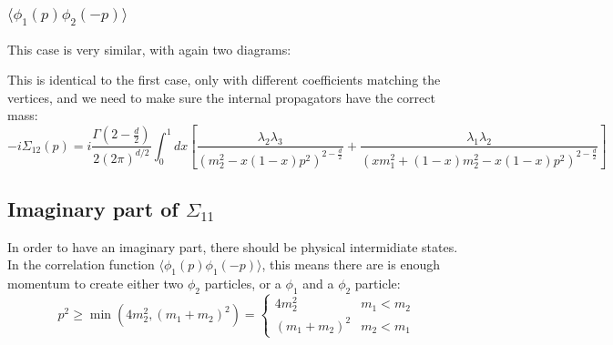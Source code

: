 \documentclass{article}
\begin{document}
\subsubsection{$\langle \phi_1(p)\phi_2(-p) \rangle$}
This case is very similar, with again two diagrams:
\begin{center}
\hspace{0.5cm}
\end{center}
This is identical to the first case, only with different coefficients matching the vertices, and we need to make sure the internal propagators have the correct mass:
\begin{equation}
    -i\Sigma_{12}(p) = i \frac{\Gamma\left(2 - \frac{d}{2}\right)}{2(2\pi)^{d/2}}\int_0^1dx \left[\frac{\lambda_2\lambda_3}{\left(m_2^2 - x(1 - x)p^2\right)^{2 - \frac{d}{2}}} + \frac{\lambda_1\lambda_2}{\left(xm_1^2 + (1 - x)m_2^2 - x(1 - x)p^2\right)^{2 - \frac{d}{2}}}\right]
\end{equation}
\subsection{Imaginary part of $\Sigma_{11}$}
In order to have an imaginary part, there should be physical intermidiate states. In the correlation function $\langle \phi_1(p)\phi_1(-p) \rangle$, this means there are is enough momentum to create either two $\phi_2$ particles, or a $\phi_1$ and a $\phi_2$ particle:
\begin{equation}
    p^2 \ge \min(4m_2^2, (m_1 + m_2)^2) = \begin{cases}
        4m_2^2 & m_1 < m_2 \\ (m_1 + m_2)^2 & m_2 < m_1
    \end{cases}
\end{equation}
\end{document}
